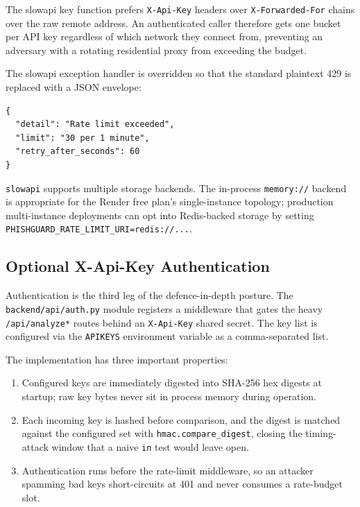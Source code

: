 The slowapi key function prefers \texttt{X-Api-Key} headers over \texttt{X-Forwarded-For} chains over the raw remote address. An authenticated caller therefore gets one bucket per API key regardless of which network they connect from, preventing an adversary with a rotating residential proxy from exceeding the budget.

The slowapi exception handler is overridden so that the standard plaintext 429 is replaced with a JSON envelope:

\begin{verbatim}
{
  "detail": "Rate limit exceeded",
  "limit": "30 per 1 minute",
  "retry_after_seconds": 60
}
\end{verbatim}

\texttt{slowapi} supports multiple storage backends. The in-process \texttt{memory://} backend is appropriate for the Render free plan's single-instance topology; production multi-instance deployments can opt into Redis-backed storage by setting \texttt{PHISHGUARD\_RATE\_LIMIT\_URI=redis://...}.

\subsection{Optional X-Api-Key Authentication}

Authentication is the third leg of the defence-in-depth posture. The \texttt{backend/api/auth.py} module registers a middleware that gates the heavy \texttt{/api/analyze*} routes behind an \texttt{X-Api-Key} shared secret. The key list is configured via the \texttt{APIKEYS} environment variable as a comma-separated list.

The implementation has three important properties:

\begin{enumerate}
\item
  Configured keys are immediately digested into SHA-256 hex digests at startup; raw key bytes never sit in process memory during operation.
\item
  Each incoming key is hashed before comparison, and the digest is matched against the configured set with \texttt{hmac.compare\_digest}, closing the timing-attack window that a naive \texttt{in} test would leave open.
\item
  Authentication runs before the rate-limit middleware, so an attacker spamming bad keys short-circuits at 401 and never consumes a rate-budget slot.
\end{enumerate}

